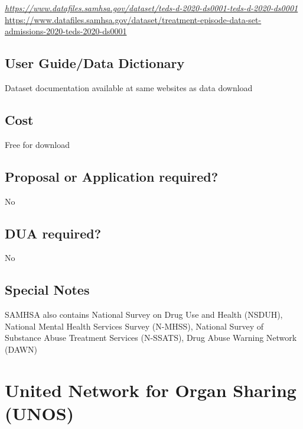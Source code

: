 \documentclass[
]{book}
\begin{document}
\emph{\url{https://www.datafiles.samhsa.gov/dataset/teds-d-2020-ds0001-teds-d-2020-ds0001}
}\url{https://www.datafiles.samhsa.gov/dataset/treatment-episode-data-set-admissions-2020-teds-2020-ds0001}

\hypertarget{user-guidedata-dictionary-90}{%
\section{User Guide/Data Dictionary}\label{user-guidedata-dictionary-90}}

Dataset documentation available at same websites as data download

\hypertarget{cost-90}{%
\section{Cost}\label{cost-90}}

Free for download

\hypertarget{proposal-or-application-required-90}{%
\section{Proposal or Application required?}\label{proposal-or-application-required-90}}

No

\hypertarget{dua-required-90}{%
\section{DUA required?}\label{dua-required-90}}

No

\hypertarget{special-notes-90}{%
\section{Special Notes}\label{special-notes-90}}

SAMHSA also contains National Survey on Drug Use and Health (NSDUH), National Mental Health Services Survey (N-MHSS), National Survey of Substance Abuse Treatment Services (N-SSATS), Drug Abuse Warning Network (DAWN)

\mainmatter

\hypertarget{united-network-for-organ-sharing-unos}{%
\chapter{United Network for Organ Sharing (UNOS)}\label{united-network-for-organ-sharing-unos}}
\end{document}
